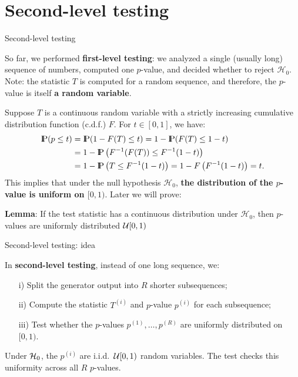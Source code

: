 \documentclass[aspectratio=169]{beamer}
\newcommand{\Prob}{{\rm I\hspace{-0.8mm}P}}
\begin{document}
\section{Second-level testing}

\begin{frame}{Second-level testing}

 So far, we performed \textbf{first-level testing}: we analyzed a single (usually long) sequence of numbers,
 computed one $p$-value, and decided whether to reject $\mathcal{H}_0$.
\pause
 Note: the statistic $T$ is computed for a random sequence, and therefore, the $p$-value   is itself \textbf{a random variable}.

 \pause
 Suppose $T$ is a continuous random variable with a strictly increasing cumulative distribution function (c.d.f.) $F$. For $t \in [0,1]$, we have:
\begin{align*}
\Prob(p \leq t) &= \Prob(1 - F(T) \leq t) = 1 - \Prob(F(T) \leq 1 - t) \\
&= 1 - \Prob\left( F^{-1}(F(T)) \leq F^{-1}(1 - t) \right) \\
&= 1 - \Prob\left( T \leq F^{-1}(1 - t) \right) = 1 - F\left( F^{-1}(1 - t) \right) = t.
\end{align*}
This implies that under the null hypothesis $\mathcal{H}_0$,
\textbf{the distribution of the $p$-value is uniform on $[0,1)$}.
Later we will prove:\medskip\par\noindent
\textbf{Lemma}:  If the test statistic has a continuous distribution under $\mathcal{H}_0$,
 then $p$-values are uniformly distributed ${\cal U}[0,1)$


\end{frame}

\begin{frame}{Second-level testing: idea}


\medskip
\noindent
In \textbf{second-level testing}, instead of one long sequence, we:
\begin{itemize}
 \item[i)] Split the generator output into $R$ shorter subsequences;
 \item[ii)] Compute the statistic $T^{(i)}$ and $p$-value $p^{(i)}$ for each subsequence;
 \item[iii)] Test whether the $p$-values $p^{(1)}, \ldots, p^{(R)}$ are uniformly distributed on $[0,1)$.
\end{itemize}

\medskip
\noindent
Under ${\cal H}_0$, the $p^{(i)}$ are i.i.d.\ ${\cal U}[0,1)$ random variables.
The test checks this uniformity across all $R$ $p$-values.
\end{frame}
\end{document}
